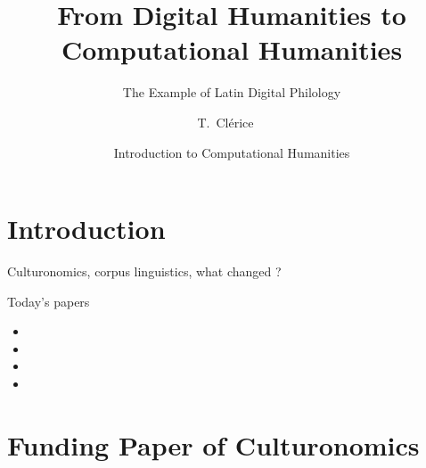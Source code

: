 \documentclass[aspectratio=169]{beamer}
\title[Intro to CH] %
{From Digital Humanities to Computational Humanities}\subtitle{The Example of Latin Digital Philology}
\author[Clérice, Thibault] %
{T.~Clérice~\inst{1}~\inst{2}}
\institute[Inria] %
{
  \inst{1}%
  ALMAnaCH, Inria, Paris, France \and
  \inst{2}%
  FeDHLab, Università Federico II, Napoli, Italia
 }
\date[2024] %
{Introduction to Computational Humanities}
\begin{document}
\frame{\titlepage}


\section{Introduction}

\begin{frame}{Culturonomics, corpus linguistics, what changed ?}
\end{frame}

\begin{frame}{Today's papers}

    \begin{itemize}
        \item {}
        \item {}
        \item {}
        \item {}
    \end{itemize}
    
\end{frame}

\section{Funding Paper of Culturonomics}

\begin{frame}{}
    
\end{frame}
\end{document}
